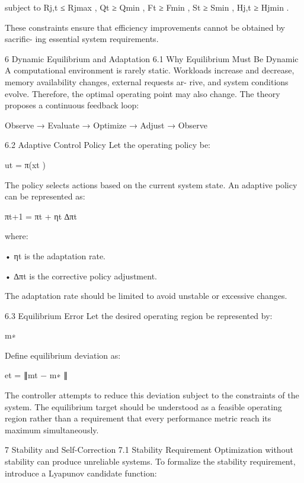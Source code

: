 \documentclass[10pt,a4paper]{article}
\begin{document}
\begin{ManuscriptText}
                                subject to Rj,t ≤ Rjmax ,
                                            Qt ≥ Qmin ,
                                            Ft ≥ Fmin ,
                                            St ≥ Smin ,
                                            Hj,t ≥ Hjmin .

    These constraints ensure that efficiency improvements cannot be obtained by sacrific-
ing essential system requirements.


6     Dynamic Equilibrium and Adaptation
6.1    Why Equilibrium Must Be Dynamic
A computational environment is rarely static.
    Workloads increase and decrease, memory availability changes, external requests ar-
rive, and system conditions evolve.
    Therefore, the optimal operating point may also change.
    The theory proposes a continuous feedback loop:

                 Observe → Evaluate → Optimize → Adjust → Observe


6.2    Adaptive Control Policy
Let the operating policy be:

                                       ut = π(xt )

    The policy selects actions based on the current system state.
    An adaptive policy can be represented as:

                                   πt+1 = πt + ηt ∆πt


    where:

    • ηt is the adaptation rate.

    • ∆πt is the corrective policy adjustment.

    The adaptation rate should be limited to avoid unstable or excessive changes.


6.3     Equilibrium Error
Let the desired operating region be represented by:

                                             m∗

    Define equilibrium deviation as:

                                       et = ∥mt − m∗ ∥

   The controller attempts to reduce this deviation subject to the constraints of the
system.
   The equilibrium target should be understood as a feasible operating region rather
than a requirement that every performance metric reach its maximum simultaneously.


7     Stability and Self-Correction
7.1     Stability Requirement
Optimization without stability can produce unreliable systems.
  To formalize the stability requirement, introduce a Lyapunov candidate function:


\end{ManuscriptText}
\end{document}

